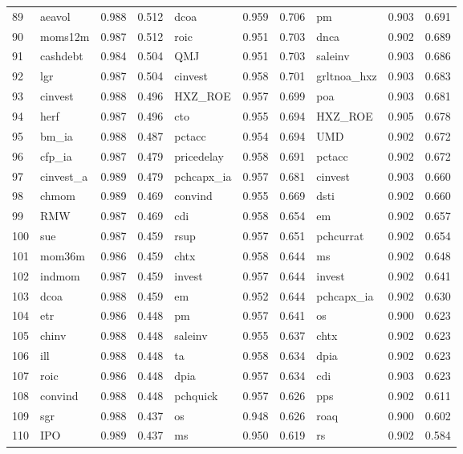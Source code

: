 \begin{landscape}
\begin{footnotesize}
\begin{longtable}{l|lcc|lcc|lcc}
  89 & aeavol & 0.988 & 0.512 & dcoa & 0.959 & 0.706 & pm & 0.903 & 0.691 \\ 
  90 & moms12m & 0.987 & 0.512 & roic & 0.951 & 0.703 & dnca & 0.902 & 0.689 \\ 
  91 & cashdebt & 0.984 & 0.504 & QMJ & 0.951 & 0.703 & saleinv & 0.903 & 0.686 \\ 
  92 & lgr & 0.987 & 0.504 & cinvest & 0.958 & 0.701 & grltnoa\_hxz & 0.903 & 0.683 \\ 
  93 & cinvest & 0.988 & 0.496 & HXZ\_ROE & 0.957 & 0.699 & poa & 0.903 & 0.681 \\ 
  94 & herf & 0.987 & 0.496 & cto & 0.955 & 0.694 & HXZ\_ROE & 0.905 & 0.678 \\ 
  95 & bm\_ia & 0.988 & 0.487 & pctacc & 0.954 & 0.694 & UMD & 0.902 & 0.672 \\ 
  96 & cfp\_ia & 0.987 & 0.479 & pricedelay & 0.958 & 0.691 & pctacc & 0.902 & 0.672 \\ 
  97 & cinvest\_a & 0.989 & 0.479 & pchcapx\_ia & 0.957 & 0.681 & cinvest & 0.903 & 0.660 \\ 
  98 & chmom & 0.989 & 0.469 & convind & 0.955 & 0.669 & dsti & 0.902 & 0.660 \\ 
  99 & RMW & 0.987 & 0.469 & cdi & 0.958 & 0.654 & em & 0.902 & 0.657 \\ 
  100 & sue & 0.987 & 0.459 & rsup & 0.957 & 0.651 & pchcurrat & 0.902 & 0.654 \\ 
  101 & mom36m & 0.986 & 0.459 & chtx & 0.958 & 0.644 & ms & 0.902 & 0.648 \\ 
  102 & indmom & 0.987 & 0.459 & invest & 0.957 & 0.644 & invest & 0.902 & 0.641 \\ 
  103 & dcoa & 0.988 & 0.459 & em & 0.952 & 0.644 & pchcapx\_ia & 0.902 & 0.630 \\ 
  104 & etr & 0.986 & 0.448 & pm & 0.957 & 0.641 & os & 0.900 & 0.623 \\ 
  105 & chinv & 0.988 & 0.448 & saleinv & 0.955 & 0.637 & chtx & 0.902 & 0.623 \\ 
  106 & ill & 0.988 & 0.448 & ta & 0.958 & 0.634 & dpia & 0.902 & 0.623 \\ 
  107 & roic & 0.986 & 0.448 & dpia & 0.957 & 0.634 & cdi & 0.903 & 0.623 \\ 
  108 & convind & 0.988 & 0.448 & pchquick & 0.957 & 0.626 & pps & 0.902 & 0.611 \\ 
  109 & sgr & 0.988 & 0.437 & os & 0.948 & 0.626 & roaq & 0.900 & 0.602 \\ 
  110 & IPO & 0.989 & 0.437 & ms & 0.950 & 0.619 & rs & 0.902 & 0.584 \\ 

\end{longtable}
\end{footnotesize}
\end{landscape}
